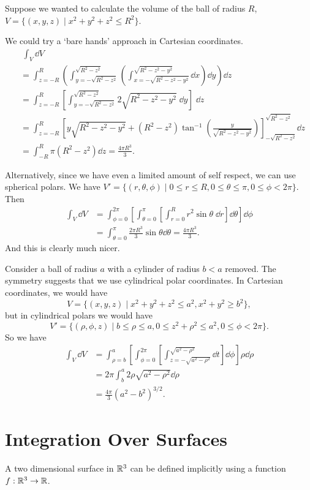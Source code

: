 \documentclass[a4paper]{scrreprt}
\begin{document}
\begin{example}
	Suppose we wanted to calculate the volume of the ball of radius $R$, $V = \{(x, y, z) \mid x^2 + y^2 + z^2 \leq R^2\}$. 
	
	We could try a `bare hands' approach in Cartesian coordinates.
	\begin{align*}
		&\ \int_V \dd V\\ &= \int_{z=-R}^{R} \left(\int_{y = - \sqrt{R^2 - z^2}}^{\sqrt{R^2 - z^2}} \left( \int_{x = - \sqrt{R^2 - z^2 - y^2}}^{\sqrt{R^2 - z^2 - y^2}} \dd x\right)\dd y\right)\dd z \\
		&=\int_{z=-R}^{R}\left[\int_{y=-\sqrt{R^{2}-z^{2}}}^{\sqrt{R^{2}-z^{2}}} 2 \sqrt{R^{2}-z^{2}-y^{2}}\; \dd y\right] \;\dd z\\
		&= \int_{z = -R}^{R}\left[y \sqrt{R^2 - z^2 - y^2} + (R^2 - z^2)\tan^{-1}\left(\frac{y}{\sqrt{R^2 - z^2 - y^2}}\right)\right]_{-\sqrt{R^2 - z^2}}^{\sqrt{R^2 - z^2}} \dd z \\
		&= \int_{-R}^R \pi (R^2 - z^2) \dd z = \frac{4 \pi R^3}{3}.
	\end{align*}

	Alternatively, since we have even a limited amount of self respect, we can use spherical polars. We have $V' = \{(r, \theta, \phi) \mid 0 \leq r \leq R, 0 \leq \theta \leq \pi, 0 \leq \phi < 2\pi\}$. Then
	\begin{align*}
		\int_V \dd V &= \int_{\phi=0}^{2 \pi}\left[\int_{\theta=0}^{\pi}\left[\int_{r=0}^{R} r^{2} \sin \theta \; \dd r\right] \dd \theta\right] \dd \phi \\
		&= \int_{\theta=0}^{\pi} \frac{2 \pi R^{3}}{3} \sin \theta \dd\theta = \frac{4 \pi R^3}{3}.
	\end{align*}
	And this is clearly much nicer.
\end{example}

\begin{example}
	Consider a ball of radius $a$ with a cylinder of radius $b < a$ removed. The symmetry suggests that we use cylindrical polar coordinates. In Cartesian coordinates, we would have
	$$
	V = \{(x, y, z) \mid x^2 + y^2 + z^2 \leq a^2, x^2 + y^2 \geq b^2 \},
	$$
	but in cylindrical polars we would have
	$$
	V' = \{(\rho, \phi, z) \mid b \leq \rho \leq a, 0 \leq z^2 + \rho^2 \leq a^2, 0 \leq \phi < 2 \pi\}.
	$$
	So we have
	\begin{align*}
		\int_V \dd V &= \int_{\rho=b}^a \left[\int_{\phi = 0}^{2\pi}\left[\int_{z = -\sqrt{a^2 - \rho^2}}^{\sqrt{a^2 - \rho^2}}\dd t\right]\dd \phi\right]\rho \dd \rho \\
		&= 2 \pi \int_{b}^a 2\rho\sqrt{a^2 - \rho^2} \dd \rho \\
		&= \frac{4 \pi}{3}(a^2 - b^2)^{3/2}.
	\end{align*}
\end{example}

\section{Integration Over Surfaces}

A two dimensional surface in $\mathbb{R}^3$ can be defined implicitly using a function $f : \mathbb{R}^3 \rightarrow \mathbb{R}$.
\end{document}
